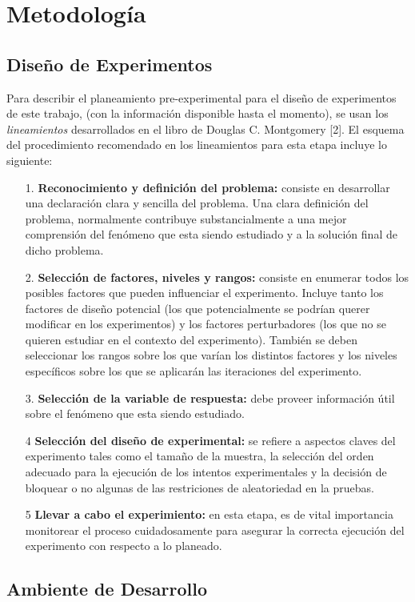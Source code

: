 \section{\textbf{Metodolog\'ia}}
\subsection{Dise\~no de Experimentos}
Para describir el planeamiento pre-experimental para el dise\~no de experimentos de este trabajo, (con la informaci\'on disponible hasta el momento), se usan los \textit{lineamientos} desarrollados en el libro de Douglas C. Montgomery [2]. El esquema del procedimiento recomendado en los lineamientos para esta etapa incluye lo siguiente:
\begin{itemize}
\item [1.] \textbf{Reconocimiento y definici\'on del problema:} consiste en desarrollar una declaraci\'on clara y sencilla del problema. Una clara definici\'on del problema, normalmente contribuye substancialmente a una mejor comprensi\'on del fen\'omeno que esta siendo estudiado y a la soluci\'on final de dicho problema.
\item [2.] \textbf{Selecci\'on de factores, niveles y rangos:} consiste en enumerar todos los posibles factores que pueden influenciar el experimento. Incluye tanto los factores de dise\~no potencial (los que potencialmente se podr\'ian querer modificar en los experimentos) y los factores perturbadores (los que no se quieren estudiar en el contexto del experimento). Tambi\'en se deben seleccionar los rangos sobre los que var\'ian los distintos factores y los niveles espec\'ificos sobre los que se aplicar\'an las iteraciones del experimento.
\item [3.] \textbf{Selecci\'on de la variable de respuesta:} debe proveer informaci\'on \'util sobre el fen\'omeno que esta siendo estudiado.
\item [4] \textbf{Selecci\'on del dise\~no de experimental:} se refiere a aspectos claves del experimento tales como el tama\~no de la muestra, la selecci\'on del orden adecuado para la ejecuci\'on de los intentos experimentales y la decisi\'on de bloquear o no algunas de las restriciones de aleatoriedad en la pruebas.
\item [5] \textbf{Llevar a cabo el experimiento:} en esta etapa, es de vital importancia monitorear el proceso cuidadosamente para asegurar la correcta ejecuci\'on del experimento con respecto a lo planeado.
\end{itemize}
\subsection{Ambiente de Desarrollo}
